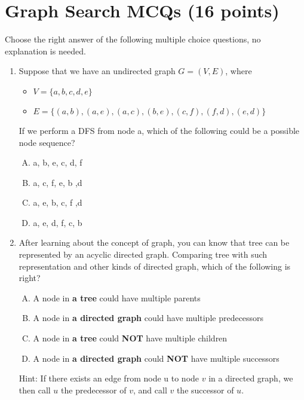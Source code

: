 \documentclass[11pt]{exam}
\begin{document}
\section{Graph Search MCQs (16 points)}
Choose the right answer of the following multiple choice questions, no explanation is needed. 
\begin{enumerate}
    \item Suppose that we have an undirected graph $G=(V,E)$, where
    \begin{itemize}
        \item $V=\{a,b,c,d,e\}$
        \item $E = \{(a, b), (a, e), (a, c), (b, e), (c, f), (f, d), (e, d)\}$
    \end{itemize}
    If we perform a DFS from node a, which of the following could be a possible node sequence?
    \begin{enumerate}[A.]
        \item a, b, e, c, d, f
        \item a, c, f, e, b ,d
        \item a, e, b, c, f ,d
        \item a, e, d, f, c, b
    \end{enumerate}
    \begin{solution}
    \end{solution}
    \item After learning about the concept of graph, you can know that tree can be represented by an acyclic directed graph. Comparing tree with such representation and other kinds of directed graph, which of the following is right?
    \begin{enumerate}[A.]
        \item A node in \textbf{a tree} could have multiple parents
        \item A node in \textbf{a directed graph} could have multiple predecessors
        \item A node in \textbf{a tree} could \textbf{NOT} have multiple children
        \item A node in \textbf{a directed graph} could \textbf{NOT} have multiple successors
    \end{enumerate}
    Hint: If there exists an edge from node u to node $v$ in a directed graph, we then call $u$ the predecessor of $v$, and call $v$ the successor of $u$.
    \begin{solution}
    \end{solution}

\end{enumerate}
\end{document}
